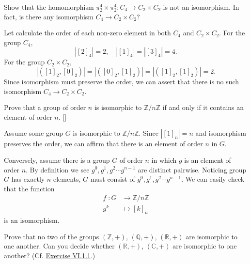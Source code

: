\documentclass[12pt,letterpaper,boxed]{hmcpset}
\begin{document}
\begin{problem}[4.2]
 Show that the homomorphism $\pi_2^4\times\pi_2^4:C_4\rightarrow C_2\times C_2$ is not an isomorphism. In fact, is there any isomorphism $C_4\rightarrow C_2\times C_2$?
\end{problem}

\begin{solution}
	Let calculate the order of each non-zero element in both $C_4$ and $ C_2\times C_2$. For the group $C_4$,
	\[
	|[2]_4|=2,\quad\left|[1]_4\right|=\left|[3]_4\right|=4.
	\]
	For the group $C_2\times C_2$,
	\[
	|([1]_2,[0]_2)|=|([0]_2,[1]_2)|=|([1]_2,[1]_2)|=2.
	\]
	Since isomorphism must preserve the order, we can assert that there is no such isomorphism $C_4\rightarrow C_2\times C_2$.
\end{solution}


\begin{problem}[4.3]
	Prove that a group of order $n$ is isomorphic to $\mathbb{Z}/n\mathbb{Z}$ if and only if it contains
	an element of order $n$. []
\end{problem}

\begin{solution}
	Assume some group $G$ is isomorphic to $\mathbb{Z}/n\mathbb{Z}$. Since $|[1]_n|=n$ and isomorphism preserves the order, we can affirm that there is an element of order $n$ in $G$. 
	
	\noindent Conversely, assume there is a group $G$ of order $n$ in which $g$ is an element of order $n$. By definition we see $g^0,g^1,g^2\cdots g^{n-1}$ are distinct pairwise. Noticing group $G$ has exactly $n$ elements, $G$ must consist of $g^0,g^1,g^2\cdots g^{n-1}$. We can easily check that the function
	\[
	\begin{aligned}
	f\;: G&\longrightarrow \mathbb{Z}/n\mathbb{Z}\\  
	g^k&\longmapsto [k]_n
	\end{aligned}
	\]	
	is an isomorphism.	
\end{solution}


\begin{problem}[4.4]
	Prove that no two of the groups $(\mathbb{Z}, +)$, $(\mathbb{Q}, +)$, $(\mathbb{R},+)$ are isomorphic to one another. Can you decide whether $(\mathbb{R}, +)$, $(\mathbb{C}, +)$ are isomorphic to one another? (Cf. \hyperlink{Exercise VI.1.1}{Exercise VI.1.1}.)
\end{problem}
\end{document}

